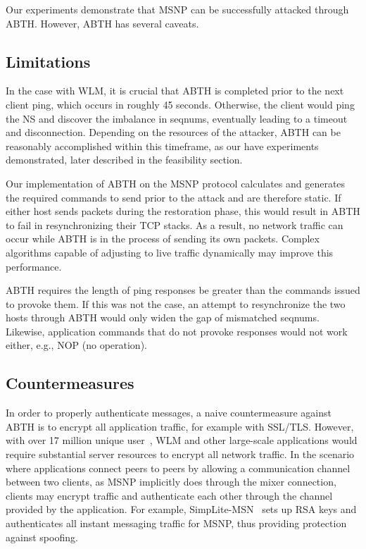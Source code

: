 \documentclass{sig-alternate}
\begin{document}
Our experiments demonstrate that MSNP can be successfully attacked through ABTH.
However, ABTH has several caveats.

\subsection{Limitations}

In the case with WLM, it is crucial that ABTH is completed prior to the next client ping, which occurs in roughly 45 seconds.
Otherwise, the client would ping the NS and discover the imbalance in seqnums, eventually leading to a timeout and disconnection.
Depending on the resources of the attacker, ABTH can be reasonably accomplished within this timeframe, as our have experiments demonstrated, later described in the feasibility section.

Our implementation of ABTH on the MSNP protocol calculates and generates the required commands to send prior to the attack and are therefore static.
If either host sends packets during the restoration phase, this would result in ABTH to fail in resynchronizing their TCP stacks.
As a result, no network traffic can occur while ABTH is in the process of sending its own packets.
Complex algorithms capable of adjusting to live traffic dynamically may improve this performance.

ABTH requires the length of ping responses be greater than the commands issued to provoke them.
If this was not the case, an attempt to resynchronize the two hosts through ABTH would only widen the gap of mismatched seqnums.
Likewise, application commands that do not provoke responses would not work either, e.g., NOP (no operation).

\subsection{Countermeasures}

In order to properly authenticate messages, a naive countermeasure against ABTH is to encrypt all application traffic, for example with SSL/TLS.
However, with over 17 million unique user~\cite{templeton:spoof}, WLM and other large-scale applications would require substantial server resources to encrypt all network traffic.
In the scenario where applications connect peers to peers by allowing a communication channel between two clients, as MSNP implicitly does through the mixer connection, clients may encrypt traffic and authenticate each other through the channel provided by the application.
For example, SimpLite-MSN~\cite{secway:url} sets up RSA keys and authenticates all instant messaging traffic for MSNP, thus providing protection against spoofing.
\end{document}
